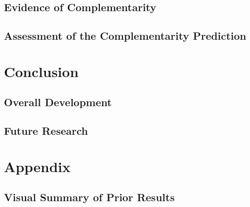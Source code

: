 \documentclass[12pt]{article}
\begin{document}
\subsection{Evidence of Complementarity} 





\subsection{Assessment of the Complementarity Prediction} 






\section{Conclusion}



\subsection{Overall Development}








\subsection{Future Research}






\section*{Appendix}

\subsection*{Visual Summary of Prior Results} 
\end{document}
